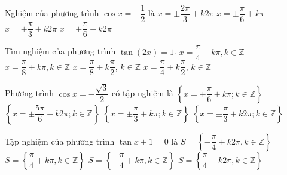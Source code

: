 \begin{ex}%
	Nghiệm của phương trình $\cos x=-\dfrac{1}{2}$  là
	\choice 
		 {\True $x=\pm \dfrac{2\pi }{3}+k2\pi $}
		 {$x=\pm \dfrac{\pi }{6}+k\pi $}
		{$x=\pm \dfrac{\pi }{3}+k2\pi  $}
		{$x=\pm \dfrac{\pi  }{6}+k2\pi $}
\end{ex}

\begin{ex}%
	Tìm nghiệm của phương trình $\tan  (2x)=1$.
	\choice 
		{$x=\dfrac{\pi}{4}+k\pi,k\in \mathbb{Z}$} 
		{$x=\dfrac{\pi}{8}+k\pi,k\in  \mathbb{Z}$}
		{\True  $x=\dfrac{\pi}{8}+k\dfrac{\pi}{2}$, $k\in \mathbb{Z}$}
		{$x=\dfrac{\pi}{4}+k\dfrac{\pi}{2}$, $k\in \mathbb{Z}$} 
\end{ex}

\begin{ex}%
	Phương trình $\cos x=-\dfrac{\sqrt{3}}{2}$ có tập  nghiệm là
	 \choice
		{$\left\{ x=\pm \dfrac{\pi  }{6}+k\pi; k\in \mathbb{Z} \right\}$}
		{\True $\left\{ x=\pm \dfrac{5\pi }{6}+k2\pi; k\in \mathbb{Z} \right\}$} 
		{$\left\{ x=\pm \dfrac{\pi }{3}+k\pi;  k\in \mathbb{Z} \right\}$}
		{$\left\{ x=\pm \dfrac{\pi }{3}+k2\pi; k\in \mathbb{Z} \right\}$} 
\end{ex}

\begin{ex}%
	Tập  nghiệm của phương trình $\tan x+1=0$ là
	\choice 
		{$S=\left\{ -\dfrac{\pi }{4}+k2\pi ,k\in \mathbb{Z} \right\}$} 
		{$S=\left\{ \dfrac{\pi  }{4}+k\pi ,k\in \mathbb{Z} \right\}$}
		{\True $S=\left\{ -\dfrac{\pi }{4}+k\pi ,k\in \mathbb{Z} \right\}$} 
		{$S=\left\{ \dfrac{\pi }{4}+k2\pi ,k\in \mathbb{Z}  \right\}$}
\end{ex}


